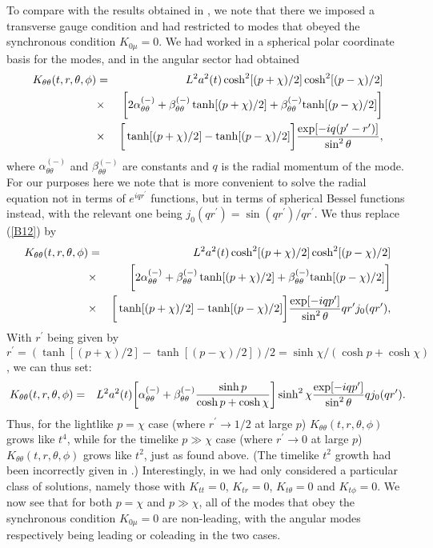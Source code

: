 To compare with the results obtained in \cite{mannheim_2012}, we note that there we imposed a  transverse gauge condition and had restricted to modes that obeyed the synchronous condition $K_{0\mu}=0$. We had worked in a spherical polar coordinate basis for the modes, and in the angular sector had obtained 
%
\begin{eqnarray}
K_{\theta\theta}(t,r,\theta,\phi)&=&L^2a^2(t)\cosh^2[(p+\chi)/2]\cosh^2[(p-\chi)/2]
\\
&\times&\bigg{[}2\alpha^{(-)}_{\theta\theta}+\beta^{(-)}_{\theta\theta}\tanh[(p+\chi)/2]+\beta^{(-)}_{\theta\theta}{\rm tanh}[(p-\chi)/2]\bigg{]}
\nonumber\\
&\times&\bigg{[}\tanh[(p+\chi)/2]-\tanh[(p-\chi)/2]\bigg{]}\frac{\exp[-iq(p^{\prime}-r^{\prime})]}{\sin^2\theta},
\nonumber
\label{B12}
\end{eqnarray}
%
where $\alpha^{(-)}_{\theta\theta}$ and $\beta^{(-)}_{\theta\theta}$ are constants and $q$ is the radial momentum of the mode. For our purposes here we note that is more convenient to solve the radial equation not in terms of $e^{iqr^{\prime}}$ functions, but in terms of spherical Bessel functions instead, with the relevant one being $j_0(qr^{\prime})=\sin(qr^{\prime})/qr^{\prime}$. We thus replace (\ref{B12}) by
%
\begin{eqnarray}
K_{\theta\theta}(t,r,\theta,\phi)&=&L^2a^2(t)\cosh^2[(p+\chi)/2]\cosh^2[(p-\chi)/2]
\\
&\times&\bigg{[}2\alpha^{(-)}_{\theta\theta}+\beta^{(-)}_{\theta\theta}\tanh[(p+\chi)/2]+\beta^{(-)}_{\theta\theta}{\rm tanh}[(p-\chi)/2]\bigg{]}
\nonumber\\
&\times&\bigg{[}\tanh[(p+\chi)/2]-\tanh[(p-\chi)/2]\bigg{]}\frac{\exp[-iqp^{\prime}]}{\sin^2\theta}qr^{\prime}j_0(qr^{\prime}),
\nonumber
\label{B13}
\end{eqnarray}
%
With $r^{\prime}$ being given by $r^{\prime}=(\tanh[(p+\chi)/2]-\tanh[(p-\chi)/2])/2=\sinh\chi/(\cosh p+\cosh \chi)$,  we can thus set: 
%
\begin{eqnarray}
K_{\theta\theta}(t,r,\theta,\phi)&=&L^2a^2(t)\bigg{[}\alpha^{(-)}_{\theta\theta}
+\beta^{(-)}_{\theta\theta}\frac{\sinh p}{\cosh p +\cosh \chi}\bigg{]}\sinh^2\chi\frac{\exp[-iqp^{\prime}]}{\sin^2\theta}qj_0(qr^{\prime}).
\nonumber\\
\label{B14}
\end{eqnarray}
%
Thus, for the lightlike $p=\chi$ case (where $r^{\prime}\rightarrow 1/2$ at large $p$) $K_{\theta\theta}(t,r,\theta,\phi)$ grows like $t^4$, while for the timelike $p\gg \chi$ case (where $r^{\prime}\rightarrow 0$ at large $p$) $K_{\theta\theta}(t,r,\theta,\phi)$ grows like $t^2$, just as found above. (The timelike $t^2$ growth had been incorrectly given in \cite{mannheim_2012}.) Interestingly, in \cite{mannheim_2012}  we had only considered a particular class of solutions, namely those with $K_{tt}=0$, $K_{tr}=0$, $K_{t\theta}=0$ and $K_{t\phi}=0$. We now see that for both $p=\chi$ and $p \gg \chi$, all of the modes that obey the synchronous condition $K_{0\mu}=0$  are non-leading, with the angular modes respectively being leading or coleading in the two cases.




